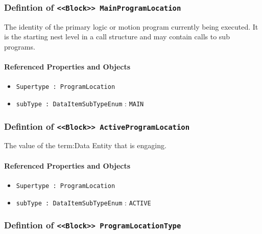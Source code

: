 \subsubsection{Defintion of \texttt{<<Block>> MainProgramLocation}}
  \label{type:MainProgramLocation}

\FloatBarrier

The identity of the primary logic or motion program currently being executed. It is the starting nest level in a call structure and may contain calls to sub programs.

\FloatBarrier
\paragraph{Referenced Properties and Objects}

\begin{itemize}
\item \texttt{Supertype : ProgramLocation}

\item \texttt{subType : DataItemSubTypeEnum} : \texttt{MAIN}

\end{itemize}
\FloatBarrier
\subsubsection{Defintion of \texttt{<<Block>> ActiveProgramLocation}}
  \label{type:ActiveProgramLocation}

\FloatBarrier

The value of the {term:Data Entity} that is engaging.

\FloatBarrier
\paragraph{Referenced Properties and Objects}

\begin{itemize}
\item \texttt{Supertype : ProgramLocation}

\item \texttt{subType : DataItemSubTypeEnum} : \texttt{ACTIVE}

\end{itemize}
\FloatBarrier
\subsubsection{Defintion of \texttt{<<Block>> ProgramLocationType}}
  \label{type:ProgramLocationType}

